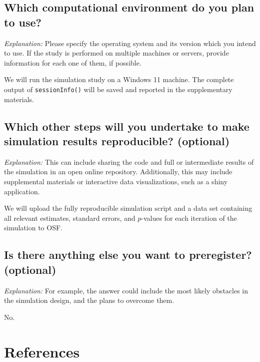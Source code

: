 \documentclass[12pt]{article}
\begin{document}
\subsection{Which computational environment do you plan to use?} 
    
\textit{Explanation:} Please specify the operating system and its version which you intend to use. If the study is performed on multiple machines or servers, provide information for each one of them, if possible. 
    
\begin{examplebox}
We will run the simulation study on a Windows 11 machine. The complete output of \texttt{sessionInfo()} will be saved and reported in the supplementary materials.
\end{examplebox} 

\subsection{Which other steps will you undertake to make simulation results reproducible? \textmd{(optional)}} 
    
\textit{Explanation:} This can include sharing the code and full or intermediate results of the simulation in an open online repository. Additionally, this may include supplemental materials or interactive data visualizations, such as a shiny application. 
    
\begin{examplebox}
We will upload the fully reproducible simulation script and a data set containing all relevant estimates, standard errors, and $p$-values for each iteration of the simulation to OSF. 
\end{examplebox}

\subsection{Is there anything else you want to preregister? \textmd{(optional)}}
    
\textit{Explanation:} For example, the answer could include the most likely obstacles in the simulation design, and the plans to overcome them. 
    
\begin{examplebox}
No.
\end{examplebox}

\newpage
\section{References}
\printbibliography[heading=none]
\end{document}
